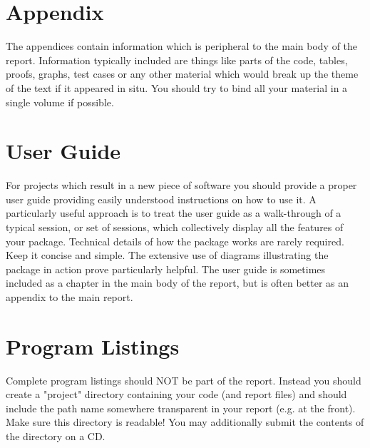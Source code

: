 \documentclass{report}
\begin{document}
\section{Appendix} The appendices contain information which is peripheral to the main body of the report. Information typically included are things like parts of the code, tables, proofs, graphs, test cases or any other material which would break up the theme of the text if it appeared in situ. You should try to bind all your material in a single volume if possible. 

\section{User Guide}
For projects which result in a new piece of software you should provide a proper user guide providing easily understood instructions on how to use it. A particularly useful approach is to treat the user guide as a walk-through of a typical session, or set of sessions, which collectively display all the features of your package. Technical details of how the package works are rarely required. Keep it concise and simple. The extensive use of diagrams illustrating the package in action prove particularly helpful. The user guide is sometimes included as a chapter in the main body of the report, but is often better as an appendix to the main report. 

\section{Program Listings}
Complete program listings should NOT be part of the report. Instead you should create a "project" directory containing your code (and report files) and should include the path name somewhere transparent in your report (e.g. at the front). Make sure this directory is readable! You may additionally submit the contents of the directory on a CD. 
\end{document}
